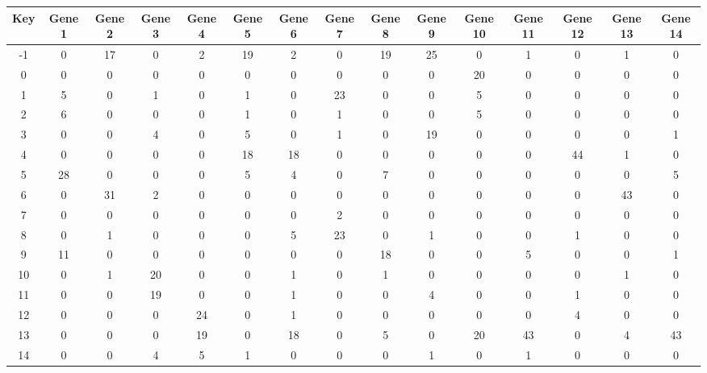 \begin{tabular}{|c|c|c|c|c|c|c|c|c|c|c|c|c|c|c|}
\hline
Key & Gene 1 & Gene 2 & Gene 3 & Gene 4 & Gene 5 & Gene 6 & Gene 7 & Gene 8 & Gene 9 & Gene 10 & Gene 11 & Gene 12 & Gene 13 & Gene 14 \\
\hline
-1 & 0 & 17 & 0 & 2 & 19 & 2 & 0 & 19 & 25 & 0 & 1 & 0 & 1 & 0 \\
0 & 0 & 0 & 0 & 0 & 0 & 0 & 0 & 0 & 0 & 20 & 0 & 0 & 0 & 0 \\
1 & 5 & 0 & 1 & 0 & 1 & 0 & 23 & 0 & 0 & 5 & 0 & 0 & 0 & 0 \\
2 & 6 & 0 & 0 & 0 & 1 & 0 & 1 & 0 & 0 & 5 & 0 & 0 & 0 & 0 \\
3 & 0 & 0 & 4 & 0 & 5 & 0 & 1 & 0 & 19 & 0 & 0 & 0 & 0 & 1 \\
4 & 0 & 0 & 0 & 0 & 18 & 18 & 0 & 0 & 0 & 0 & 0 & 44 & 1 & 0 \\
5 & 28 & 0 & 0 & 0 & 5 & 4 & 0 & 7 & 0 & 0 & 0 & 0 & 0 & 5 \\
6 & 0 & 31 & 2 & 0 & 0 & 0 & 0 & 0 & 0 & 0 & 0 & 0 & 43 & 0 \\
7 & 0 & 0 & 0 & 0 & 0 & 0 & 2 & 0 & 0 & 0 & 0 & 0 & 0 & 0 \\
8 & 0 & 1 & 0 & 0 & 0 & 5 & 23 & 0 & 1 & 0 & 0 & 1 & 0 & 0 \\
9 & 11 & 0 & 0 & 0 & 0 & 0 & 0 & 18 & 0 & 0 & 5 & 0 & 0 & 1 \\
10 & 0 & 1 & 20 & 0 & 0 & 1 & 0 & 1 & 0 & 0 & 0 & 0 & 1 & 0 \\
11 & 0 & 0 & 19 & 0 & 0 & 1 & 0 & 0 & 4 & 0 & 0 & 1 & 0 & 0 \\
12 & 0 & 0 & 0 & 24 & 0 & 1 & 0 & 0 & 0 & 0 & 0 & 4 & 0 & 0 \\
13 & 0 & 0 & 0 & 19 & 0 & 18 & 0 & 5 & 0 & 20 & 43 & 0 & 4 & 43 \\
14 & 0 & 0 & 4 & 5 & 1 & 0 & 0 & 0 & 1 & 0 & 1 & 0 & 0 & 0 \\
\hline
\end{tabular}